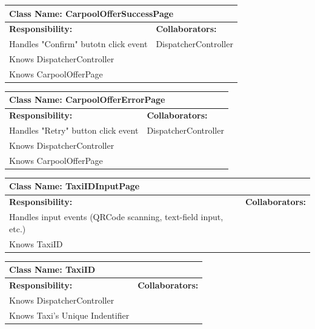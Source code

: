 \documentclass[]{article}
\begin{document}
	\begin{table}[H]
	\centering
	\begin{tabular}{|p{6cm}|p{6cm}|}
	\hline 
		\multicolumn{2}{|l|}{\textbf{Class Name: CarpoolOfferSuccessPage}} \\
	\hline
	\textbf{Responsibility:} & \textbf{Collaborators:} \\
	\hline
	Handles "Confirm" butotn click event  & DispatcherController\\ \hline 
	Knows DispatcherController &\\ \hline
	Knows CarpoolOfferPage &\\ \hline
	\end{tabular}
	\end{table}

	\begin{table}[H]
	\centering
	\begin{tabular}{|p{6cm}|p{6cm}|}
	\hline 
		\multicolumn{2}{|l|}{\textbf{Class Name: CarpoolOfferErrorPage}} \\
	\hline
	\textbf{Responsibility:} & \textbf{Collaborators:} \\
	\hline
	Handles "Retry" button click event  & DispatcherController\\ \hline 
	Knows DispatcherController &\\ \hline
	Knows CarpoolOfferPage &\\ \hline
	\end{tabular}
	\end{table}

	\begin{table}[H]
	\centering
	\begin{tabular}{|p{6cm}|p{6cm}|}
	\hline 
		\multicolumn{2}{|l|}{\textbf{Class Name: TaxiIDInputPage}} \\
	\hline
	\textbf{Responsibility:} & \textbf{Collaborators:} \\
	\hline
	Handles input events (QRCode scanning, text-field input, etc.) &\\ \hline
	Knows TaxiID&  \\ \hline
	\end{tabular}
	\end{table}

	\begin{table}[H]
	\centering
	\begin{tabular}{|p{6cm}|p{6cm}|}
	\hline 
		\multicolumn{2}{|l|}{\textbf{Class Name: TaxiID}} \\
	\hline
	\textbf{Responsibility:} & \textbf{Collaborators:} \\
	\hline
	Knows DispatcherController&  \\ \hline
	Knows Taxi's Unique Indentifier&  \\ \hline
	\end{tabular}
	\end{table}
\end{document}
